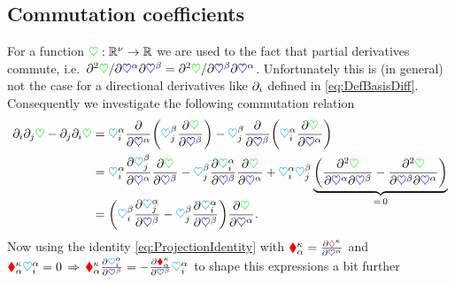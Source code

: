 \subsection{Commutation coefficients}\label{sec:CommutationCoeff}
For a function $\potentialEnergy : \RealNum^{\numCoord} \rightarrow \RealNum$ we are used to the fact that partial derivatives commute, i.e.\ $\sfrac{\partial^2 \potentialEnergy}{\partial \sysCoordCoeff{\GidxI} \partial \sysCoordCoeff{\GidxII}} = \sfrac{\partial^2 \potentialEnergy}{\partial \sysCoordCoeff{\GidxII} \partial \sysCoordCoeff{\GidxI}}$.
Unfortunately this is (in general) not the case for a directional derivatives like $\dirDiff{\LidxI}$ defined in \eqref{eq:DefBasisDiff}.
Consequently we investigate the following commutation relation
\begin{align}\label{eq:DerivationCommCoeff1}
 \dirDiff{\LidxI} \dirDiff{\LidxII} \potentialEnergy - \dirDiff{\LidxII} \dirDiff{\LidxI} \potentialEnergy 
 &= \kinMatCoeff{\GidxI}{\LidxI} \pdiff{\sysCoordCoeff{\GidxI}} \bigg( \kinMatCoeff{\GidxII}{\LidxII} \pdiff[\potentialEnergy]{\sysCoordCoeff{\GidxII}}\bigg) - \kinMatCoeff{\GidxII}{\LidxII} \pdiff{\sysCoordCoeff{\GidxII}} \bigg(\kinMatCoeff{\GidxI}{\LidxI} \pdiff[\potentialEnergy ]{\sysCoordCoeff{\GidxI}} \bigg)
\nonumber\\
 &= \kinMatCoeff{\GidxI}{\LidxI} \pdiff[\kinMatCoeff{\GidxII}{\LidxII}]{\sysCoordCoeff{\GidxI}} \pdiff[\potentialEnergy]{\sysCoordCoeff{\GidxII}} - \kinMatCoeff{\GidxII}{\LidxII} \pdiff[\kinMatCoeff{\GidxI}{\LidxI}]{\sysCoordCoeff{\GidxII}} \pdiff[\potentialEnergy ]{\sysCoordCoeff{\GidxI}}
 + \kinMatCoeff{\GidxI}{\LidxI} \kinMatCoeff{\GidxII}{\LidxII} \underbrace{\bigg( \frac{\partial^2 \potentialEnergy}{\partial\sysCoordCoeff{\GidxI} \partial\sysCoordCoeff{\GidxII}} - \frac{\partial^2 \potentialEnergy}{\partial\sysCoordCoeff{\GidxII} \partial\sysCoordCoeff{\GidxI}}\bigg)}_{=\,0}
\nonumber\\[-2ex]
 &= \bigg(\kinMatCoeff{\GidxII}{\LidxI} \pdiff[\kinMatCoeff{\GidxI}{\LidxII}]{\sysCoordCoeff{\GidxII}} - \kinMatCoeff{\GidxII}{\LidxII} \pdiff[\kinMatCoeff{\GidxI}{\LidxI}]{\sysCoordCoeff{\GidxII}}\bigg) \pdiff[\potentialEnergy]{\sysCoordCoeff{\GidxI}}
 .
\end{align}
Now using the identity \eqref{eq:ProjectionIdentity} with $\geoConstraintMatCoeff{\CidxI}{\GidxI} = \pdiff[\geoConstraintCoeff{\CidxI}]{\sysCoordCoeff{\GidxI}}$ and $\geoConstraintMatCoeff{\CidxI}{\GidxI} \kinMatCoeff{\GidxI}{\LidxI} = 0 \, \Rightarrow \, \geoConstraintMatCoeff{\CidxI}{\GidxI} \pdiff[\kinMatCoeff{\GidxI}{\LidxI}]{\sysCoordCoeff{\GidxII}} = -\pdiff[\geoConstraintMatCoeff{\CidxI}{\GidxI}]{\sysCoordCoeff{\GidxII}} \kinMatCoeff{\GidxI}{\LidxI}$ to shape this expressions a bit further
